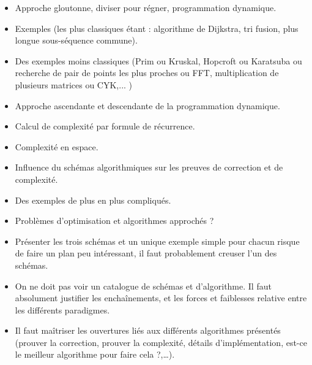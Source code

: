 \documentclass{agregfiche}
\begin{document}
\secindispensables
\begin{itemize}
    \item Approche gloutonne, diviser pour régner, programmation dynamique.
    \item Exemples (les plus classiques étant : algorithme de Dijkstra, tri fusion, plus longue sous-séquence commune).
\end{itemize}

\secasavoir

\begin{itemize}
    \item Des exemples moins classiques (Prim ou Kruskal, Hopcroft ou Karatsuba ou recherche de pair de points les plus proches ou FFT, multiplication de plusieurs matrices ou CYK,...  )
    \item Approche ascendante et descendante de la programmation dynamique.
    \item Calcul de complexité par formule de récurrence.
    \item Complexité en espace.
    \item Influence du schémas algorithmiques sur les preuves de correction et de complexité.
\end{itemize}

\secidees

\begin{itemize}
    \item Des exemples de plus en plus compliqués.
    \item Problèmes d'optimisation et algorithmes approchés ?
\end{itemize}

\secpieges

\begin{itemize}
    \item Présenter les trois schémas et un unique exemple simple pour chacun risque de faire un plan peu intéressant, il faut probablement creuser l'un des schémas.
    \item On ne doit pas voir un catalogue de schémas et d'algorithme. Il faut absolument justifier les enchaînements, et les forces et faiblesses relative entre les différents paradigmes.
    \item Il faut maîtriser les ouvertures liés aux différents algorithmes présentés (prouver la correction, prouver la complexité, détails d'implémentation, est-ce le meilleur algorithme pour faire cela ?,\ldots).
    
\end{itemize}
\end{document}
